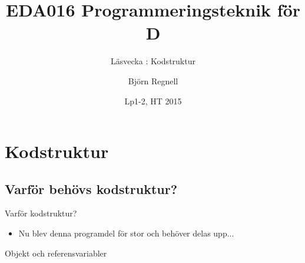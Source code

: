 \documentclass{lecturenotes}
\title[Föreläsningsanteckningar EDA016, 2015]{EDA016 Programmeringsteknik för D}
\subtitle{Läsvecka \vecka: Kodstruktur}
\author{Björn Regnell}
\institute{Datavetenskap, LTH}
\date{Lp1-2, HT 2015}
\renewcommand{\vecka}{2}
\begin{document}
\frame{\titlepage}
\section[Vecka \vecka: Kodstruktur]{Kodstruktur}
\frame{\tableofcontents}

\subsection{Varför behövs kodstruktur?}
\begin{Slide}{Varför kodstruktur?}
\begin{itemize}
\item Nu blev denna programdel för stor och behöver delas upp...
\end{itemize}
\end{Slide}


\begin{Slide}{Objekt och referensvariabler}
\end{Slide}
\end{document}
